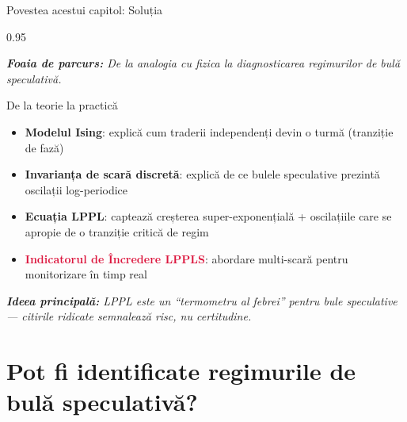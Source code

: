 \documentclass[9pt, aspectratio=169, t]{beamer}
\begin{document}
\begin{frame}{Povestea acestui capitol: Soluția}
    \begin{cminipage}{0.95\textwidth}
    {\footnotesize
    \textit{\textbf{Foaia de parcurs:} De la analogia cu fizica la diagnosticarea regimurilor de bulă speculativă.}
    \vspace{0.2cm}
    \begin{block}{De la teorie la practică}
        \begin{itemize}\setlength{\itemsep}{4pt}
            \item \textbf{Modelul Ising}: explică cum traderii independenți devin o turmă (tranziție de fază)
            \item \textbf{Invarianța de scară discretă}: explică de ce bulele speculative prezintă oscilații log-periodice
            \item \textbf{Ecuația LPPL}: captează creșterea super-exponențială + oscilațiile care se apropie de o tranziție critică de regim
            \item \textcolor{Crimson}{\textbf{Indicatorul de Încredere LPPLS}}: abordare multi-scară pentru monitorizare în timp real
        \end{itemize}
    \end{block}
    \vspace{0.2cm}
    \textit{\textbf{Ideea principală:} LPPL este un ``termometru al febrei'' pentru bule speculative --- citirile ridicate semnalează risc, nu certitudine.}
    }
    \end{cminipage}
\end{frame}

\section{Pot fi identificate regimurile de bulă speculativă?}
\end{document}
